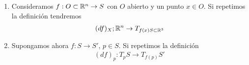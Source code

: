 \begin{ejemplo}
\begin{enumerate}
\begin{enumerate}
            Consideramos una parametrización $X:U\to S$ y un punto $p\in X(u)$. Podemos considerar por continuidad que $\alpha(t)\in X(U)$ para todo $t\in (-\veps, \veps)$. Podemos escribir
            \begin{gather*}
                f\circ \alpha = (f\circ X)\circ (X^{-1}\circ \alpha)
            \end{gather*}
            Como ambas composiciones son difereciables (AN) podemos derivar en $0$ y por la regla de la cadena:
            \begin{gather*}
                (f\circ \alpha)'(0) = d(f\circ X)_{X^{-1}(p)}(X^{-1}\circ \alpha)'(0)
            \end{gather*}
            Sabemos que $X\circ X^{-1}\circ \alpha = \alpha$ y 
            \begin{gather*}
                v = \alpha'(0) = (dX)_{X^{-1}(p)}(X^{-1}\circ \alpha)'(0)
            \end{gather*}
            por lo que despejando
            \begin{gather*}
                (X^{-1}\circ \alpha)'(0) = [(dX)_{X^{-1}(p)}]^{-1}(v)
            \end{gather*}
            y tenemos finalmente que
            \begin{gather*}
                (df)_p(v) = d(f\circ X)_{X^{-1}(p)}[(dX)_{X^{-1}(p)}]^{-1}(v)
            \end{gather*}
            y llegamos a que no depende de $\alpha$ sino solo de $v$ y además lo hace linealmente.

            \item Consideramos $f:O\subset \mathbb{R}^n \to S$ con $O$ abierto y un punto $x\in O$. Si repetimos la definición tendremos 
            \begin{gather*}
                (df)_X ; \mathbb{R}^n \to T_{f(x)S\subset \mathbb{R}^3}
            \end{gather*}

            \item Supongamos ahora $f:S\to S'$, $p\in S$. Si repetimos la definición 
            \begin{gather*}
                (df)_p : T_pS \to T_{f(p)}S'
            \end{gather*}
        \end{enumerate}
    \end{enumerate}
\end{ejemplo}

